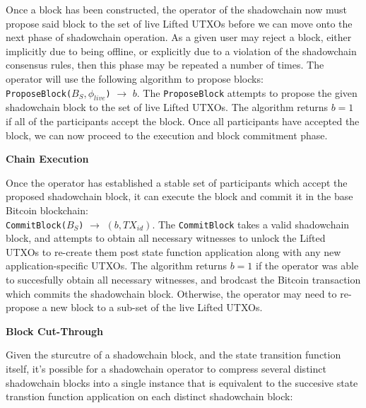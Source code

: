 \documentclass[10pt,a4paper]{article}
\theoremstyle{definition}
\begin{document}
Once a block has been constructed, the operator of the shadowchain now must
propose said block to the set of live Lifted UTXOs before we can move onto the
next phase of shadowchain operation. As a given user may reject a block, either
implicitly due to being offline, or explicitly due to a violation of the
shadowchain consensus rules, then this phase may be repeated a number of times.
The operator will use the following algorithm to propose blocks: \\

\texttt{ProposeBlock($B_S, \phi_{live}$)} $\rightarrow$ $b$. The
\texttt{ProposeBlock} attempts to propose the given shadowchain block to the
set of live Lifted UTXOs. The algorithm returns $b=1$ if all of the
participants accept the block. Once all participants have accepted the block,
we can now proceed to the execution and block commitment phase.


\begin{center}
    \textbf{Chain Execution}
\end{center}

Once the operator has established a stable set of participants which accept the
proposed shadowchain block, it can execute the block and commit it in the base Bitcoin blockchain: \\

\texttt{CommitBlock($B_S$)} $\rightarrow$ $(b, TX_{id})$. The
\texttt{CommitBlock} takes a valid shadowchain block, and attempts to obtain
all necessary witnesses to unlock the Lifted UTXOs to re-create them post state
function application along with any new application-specific UTXOs. The
algorithm returns $b=1$ if the operator was able to succesfully obtain all
necessary witnesses, and brodcast the Bitcoin transaction which commits the
shadowchain block. Otherwise, the operator may need to re-propose a new block
to a sub-set of the live Lifted UTXOs.

\begin{center}
    \textbf{Block Cut-Through}
\end{center}

Given the sturcutre of a shadowchain block, and the state transition function
itself, it's possible for a shadowchain operator to compress several distinct
shadowchain blocks into a single instance that is equivalent to the succesive
state transtion function application on each distinct shadowchain block: \\
\end{document}
